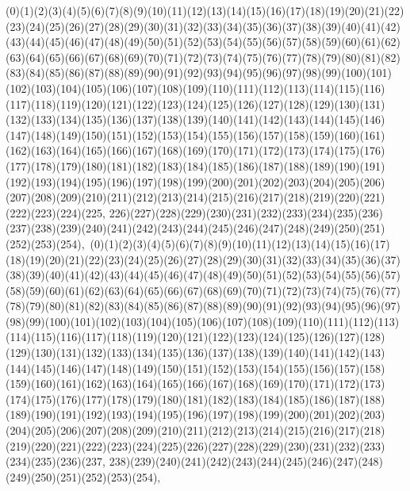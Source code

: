 \documentclass[12pt]{article}
\begin{document}
{(0)(1)(2)(3)(4)(5)(6)(7)(8)(9)(10)(11)(12)(13)(14)(15)(16)(17)(18)(19)(20)(21)(22)(23)(24)(25)(26)(27)(28)(29)(30)(31)(32)(33)(34)(35)(36)(37)(38)(39)(40)(41)(42)(43)(44)(45)(46)(47)(48)(49)(50)(51)(52)(53)(54)(55)(56)(57)(58)(59)(60)(61)(62)(63)(64)(65)(66)(67)(68)(69)(70)(71)(72)(73)(74)(75)(76)(77)(78)(79)(80)(81)(82)(83)(84)(85)(86)(87)(88)(89)(90)(91)(92)(93)(94)(95)(96)(97)(98)(99)(100)(101)(102)(103)(104)(105)(106)(107)(108)(109)(110)(111)(112)(113)(114)(115)(116)(117)(118)(119)(120)(121)(122)(123)(124)(125)(126)(127)(128)(129)(130)(131)(132)(133)(134)(135)(136)(137)(138)(139)(140)(141)(142)(143)(144)(145)(146)(147)(148)(149)(150)(151)(152)(153)(154)(155)(156)(157)(158)(159)(160)(161)(162)(163)(164)(165)(166)(167)(168)(169)(170)(171)(172)(173)(174)(175)(176)(177)(178)(179)(180)(181)(182)(183)(184)(185)(186)(187)(188)(189)(190)(191)(192)(193)(194)(195)(196)(197)(198)(199)(200)(201)(202)(203)(204)(205)(206)(207)(208)(209)(210)(211)(212)(213)(214)(215)(216)(217)(218)(219)(220)(221)(222)(223)(224)(225, 226)(227)(228)(229)(230)(231)(232)(233)(234)(235)(236)(237)(238)(239)(240)(241)(242)(243)(244)(245)(246)(247)(248)(249)(250)(251)(252)(253)(254)$
, 
$
(0)(1)(2)(3)(4)(5)(6)(7)(8)(9)(10)(11)(12)(13)(14)(15)(16)(17)(18)(19)(20)(21)(22)(23)(24)(25)(26)(27)(28)(29)(30)(31)(32)(33)(34)(35)(36)(37)(38)(39)(40)(41)(42)(43)(44)(45)(46)(47)(48)(49)(50)(51)(52)(53)(54)(55)(56)(57)(58)(59)(60)(61)(62)(63)(64)(65)(66)(67)(68)(69)(70)(71)(72)(73)(74)(75)(76)(77)(78)(79)(80)(81)(82)(83)(84)(85)(86)(87)(88)(89)(90)(91)(92)(93)(94)(95)(96)(97)(98)(99)(100)(101)(102)(103)(104)(105)(106)(107)(108)(109)(110)(111)(112)(113)(114)(115)(116)(117)(118)(119)(120)(121)(122)(123)(124)(125)(126)(127)(128)(129)(130)(131)(132)(133)(134)(135)(136)(137)(138)(139)(140)(141)(142)(143)(144)(145)(146)(147)(148)(149)(150)(151)(152)(153)(154)(155)(156)(157)(158)(159)(160)(161)(162)(163)(164)(165)(166)(167)(168)(169)(170)(171)(172)(173)(174)(175)(176)(177)(178)(179)(180)(181)(182)(183)(184)(185)(186)(187)(188)(189)(190)(191)(192)(193)(194)(195)(196)(197)(198)(199)(200)(201)(202)(203)(204)(205)(206)(207)(208)(209)(210)(211)(212)(213)(214)(215)(216)(217)(218)(219)(220)(221)(222)(223)(224)(225)(226)(227)(228)(229)(230)(231)(232)(233)(234)(235)(236)(237, 238)(239)(240)(241)(242)(243)(244)(245)(246)(247)(248)(249)(250)(251)(252)(253)(254)$
, 
$
}
\end{document}
